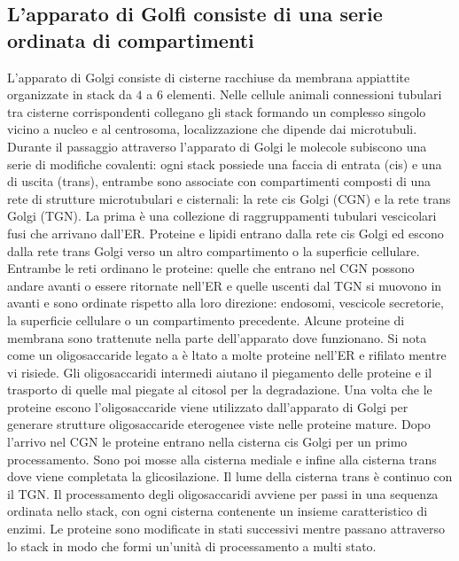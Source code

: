 \subsection{L'apparato di Golfi consiste di una serie ordinata di compartimenti}
L'apparato di Golgi consiste di cisterne racchiuse da membrana appiattite organizzate in stack da $4$ a $6$ elementi. Nelle cellule animali connessioni tubulari tra cisterne 
corrispondenti collegano gli stack formando un complesso singolo vicino a nucleo e al centrosoma, localizzazione che dipende dai microtubuli. Durante il passaggio attraverso l'apparato 
di Golgi le molecole subiscono una serie di modifiche covalenti: ogni stack possiede una faccia di entrata (cis) e una di uscita (trans), entrambe sono associate con compartimenti
composti di una rete di strutture microtubulari e cisternali: la rete cis Golgi (CGN) e la rete trans Golgi (TGN). La prima \`e una collezione di raggruppamenti tubulari vescicolari 
fusi che arrivano dall'ER. Proteine e lipidi entrano dalla rete cis Golgi ed escono dalla rete trans Golgi verso un altro compartimento o la superficie cellulare. Entrambe le reti
ordinano le proteine: quelle che entrano nel CGN possono andare avanti o essere ritornate nell'ER e quelle uscenti dal TGN si muovono in avanti e sono ordinate rispetto alla loro 
direzione: endosomi, vescicole secretorie, la superficie cellulare o un compartimento precedente. Alcune proteine di membrana sono trattenute nella parte dell'apparato dove funzionano.
Si nota come un oligosaccaride legato a  \`e ltato a molte proteine nell'ER e rifilato mentre vi risiede. Gli oligosaccaridi intermedi aiutano il piegamento delle proteine e
il trasporto di quelle mal piegate al citosol per la degradazione. Una volta che le proteine escono l'oligosaccaride viene utilizzato dall'apparato di Golgi per generare 
strutture oligosaccaride eterogenee viste nelle proteine mature. Dopo l'arrivo nel CGN le proteine entrano nella cisterna cis Golgi per un primo processamento. Sono poi mosse alla
cisterna mediale e infine alla cisterna trans dove viene completata la glicosilazione. Il lume della cisterna trans \`e continuo con il TGN. Il processamento degli oligosaccaridi
avviene per passi in una sequenza ordinata nello stack, con ogni cisterna contenente un insieme caratteristico di enzimi. Le proteine sono modificate in stati successivi mentre
passano attraverso lo stack in modo che formi un'unit\`a di processamento a multi stato. 
